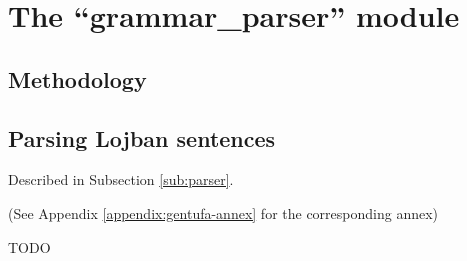 \chapter{The ``grammar\_parser'' module}

\section{Methodology}

\section{Parsing Lojban sentences}
\label{sec:parsing_lojban_sentences}

Described in Subsection \ref{sub:parser}.

(See Appendix \ref{appendix:gentufa-annex} for the corresponding annex)

TODO